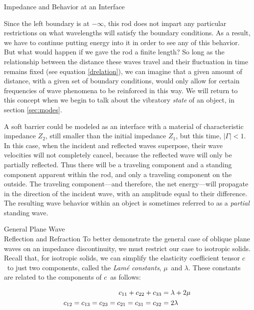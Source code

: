\documentclass[a4paper,10pt]{report}
\numberwithin{equation}{section}
\begin{document}
{\begin{chapter}
\begin{section}{Impedance and Behavior at an Interface}
\par
Since the left boundary is at $-\infty$, this rod does not impart any particular restrictions on what wavelengths will satisfy the boundary conditions. As a result, we have to continue putting energy into it in order to see any of this behavior. \cite[p.319]{Cremer1973} But what would happen if we gave the rod a finite length? So long as the relationship between the distance these waves travel and their fluctuation in time 
remains fixed (see equation \eqref{drelation}), we can imagine that a given amount of distance, with a given set of boundary conditions, would only allow for certain frequencies of wave phenomena to be reinforced in this way. We will return to this concept when we begin to talk about the vibratory \emph{state} of an object, in section \ref{sec:modes}.
\par
A soft barrier could be modeled as an interface with a material of characteristic impedance $Z_2$, still smaller than the initial impedance $Z_1$, but this time, $|\Gamma| < 1$. In this case, when the incident and reflected waves superpose, their wave velocities will not completely cancel, because the reflected wave will only be partially reflected. Thus there will be a traveling component and a standing component apparent within the rod, and only a traveling component on the outside. The traveling component---and therefore, the net energy---will propagate in the direction of the incident wave, with an amplitude equal to their difference. The resulting wave behavior within an object is sometimes referred to as a \emph{partial} standing wave. \cite[p.~275]{Hecht1987}
\par
\end{section}
\par
\begin{section}{General Plane Wave \\Reflection and Refraction}
To better demonstrate the general case of oblique plane waves on an impedance discontinuity, we must restrict our case to isotropic solids. Recall that, for isotropic solids, we can simplify the elasticity coefficient tensor $c$\  to just two components, called the \emph{Lam\'{e} constants}, $\mu$\  and $\lambda$. These constants are related to the components of $c$\  as follows\cite[p.~95]{Kino1987}:
\begin{singlespace}
\begin{align}
c_{11} + c_{22} + c_{33} &= \lambda + 2\mu \notag\\
c_{12} = c_{13} = c_{23} = c_{21} = c_{31} = c_{32} &= 2\lambda\\

\end{align}
\end{singlespace}
\end{section}
\end{chapter}}
\end{document}
